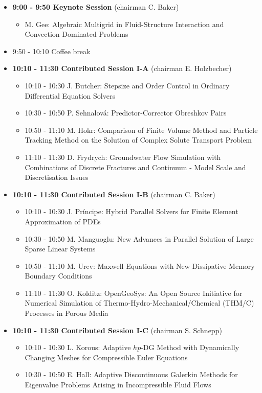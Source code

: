 \documentclass[10pt, A4]{article}%
\begin{document}
\begin{itemize}    
  \item {\bf 9:00 - 9:50 Keynote Session} (chairman C. Baker) 
  \begin{itemize}
    \item M. Gee: Algebraic Multigrid in Fluid-Structure Interaction and Convection Dominated Problems
  \end{itemize}
  \item 9:50 - 10:10 Coffee break
  \item {\bf 10:10 - 11:30 Contributed Session I-A} (chairman E. Holzbecher) 
  \begin{itemize}
    \item 10:10 - 10:30 J. Butcher: Stepsize and Order Control in Ordinary Differential Equation Solvers
    \item 10:30 - 10:50 P. Sehnalov\'{a}: Predictor-Corrector Obreshkov Pairs
    \item 10:50 - 11:10 M. Hokr: Comparison of Finite Volume Method and Particle Tracking Method on the Solution of Complex Solute Transport Problem
    \item 11:10 - 11:30 D. Frydrych: Groundwater Flow Simulation with Combinations of Discrete Fractures and Continuum - Model Scale and Discretisation Issues
  \end{itemize}
  \item {\bf 10:10 - 11:30 Contributed Session I-B} (chairman C. Baker) 
  \begin{itemize}
    \item 10:10 - 10:30 J. Pr\'{i}ncipe: Hybrid Parallel Solvers for Finite Element Approximation of PDEs
    \item 10:30 - 10:50 M. Manguoglu: New Advances in Parallel Solution of Large Sparse Linear Systems
    \item 10:50 - 11:10 M. Urev: Maxwell Equations with New Dissipative Memory Boundary Conditions
    \item 11:10 - 11:30 O. Kolditz: OpenGeoSys: An Open Source Initiative for Numerical Simulation of Thermo-Hydro-Mechanical/Chemical (THM/C) Processes in Porous Media
  \end{itemize}
  \item {\bf 10:10 - 11:30 Contributed Session I-C} (chairman S. Schnepp) 
  \begin{itemize}
    \item 10:10 - 10:30 L. Korous: Adaptive $hp$-DG Method with Dynamically Changing Meshes for Compressible Euler Equations
    \item 10:30 - 10:50 E. Hall: Adaptive Discontinuous Galerkin Methods for Eigenvalue Problems Arising in Incompressible Fluid Flows

\end{itemize}
\end{itemize}
\end{document}
